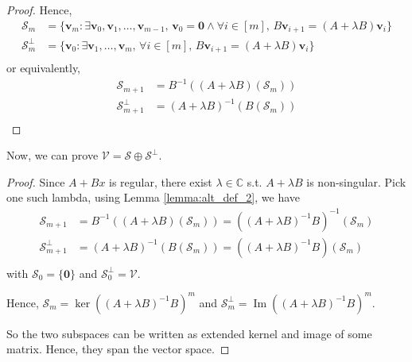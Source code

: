 \documentclass{article}
\newcommand{\0}{\mathbf{0}}
\renewcommand{\vec}{\mathbf}
\newcommand{\vv}{\vec{v}}
\newcommand{\inv}{^{-1}}
\newcommand{\C}{\mathbb{C}}
\newcommand{\vecspace}[1]{\mathcal{#1}}
\newcommand{\vsV}{\vecspace{V}}
\newcommand{\vsS}{\vecspace{S}}
\newcommand{\vsSp}{\vecspace{S}^\perp}
\DeclareMathOperator{\img}{Im}
\begin{document}
\begin{proof}
    Hence,
    \begin{align*}
        \vsS_m &= \{\vv_m:\exists \vv_0, \vv_1, \dots, \vv_{m-1},\,\vv_0=\0\land\forall i\in[m],\,B\vv_{i+1}=(A+\lambda B)\vv_i\}\\
        \vsSp_m &= \{\vv_0:\exists \vv_1, \dots, \vv_m,\,\forall i\in[m],\,B\vv_{i+1}=(A+\lambda B)\vv_i\}\\
    \end{align*}
    or equivalently,
    \begin{align*}
        \vsS_{m+1} &= B\inv((A+\lambda B)(\vsS_m))\\
        \vsSp_{m+1} &= (A+\lambda B)\inv(B(\vsS_m))\\
    \end{align*}
\end{proof}

Now, we can prove $\vsV=\vsS\oplus\vsSp$.
\begin{proof}
    Since $A+Bx$ is regular, there exist $\lambda\in\C$ s.t. $A+\lambda B$ is non-singular.
    Pick one such lambda, using Lemma \ref{lemma:alt_def_2}, we have
    \begin{align*}
        \vsS_{m+1} &= B\inv((A+\lambda B)(\vsS_m)) = ((A+\lambda B)\inv B)\inv(\vsS_m)\\
        \vsSp_{m+1} &= (A+\lambda B)\inv(B(\vsS_m)) = ((A+\lambda B)\inv B)(\vsS_m)\\
    \end{align*}
    with $\vsS_0=\{\0\}$ and $\vsSp_0=\vsV$.

    Hence, $\vsS_m=\ker((A+\lambda B)\inv B)^m$ and $\vsSp_m=\img((A+\lambda B)\inv B)^m$.

    So the two subspaces can be written as extended kernel and image of some matrix. Hence, they span the vector space.

\end{proof}
\end{document}
